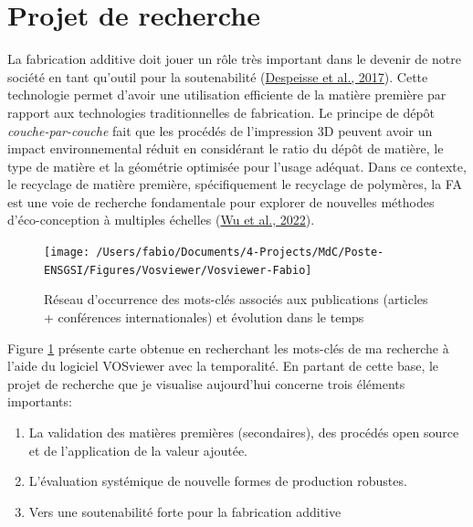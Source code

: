 \documentclass[
  12pt,
  oneside]{book}
\providecommand{\tightlist}{%
  \setlength{\itemsep}{0pt}\setlength{\parskip}{0pt}}
\begin{document}
\hypertarget{projet-de-recherche}{%
\section{Projet de recherche}\label{projet-de-recherche}}

La fabrication additive doit jouer un rôle très important dans le devenir de notre société en tant qu'outil pour la soutenabilité (\protect\hyperlink{ref-Despeisse2016}{Despeisse et al., 2017}). Cette technologie permet d'avoir une utilisation efficiente de la matière première par rapport aux technologies traditionnelles de fabrication. Le principe de dépôt \emph{couche-par-couche} fait que les procédés de l'impression 3D peuvent avoir un impact environnemental réduit en considérant le ratio du dépôt de matière, le type de matière et la géométrie optimisée pour l'usage adéquat. Dans ce contexte, le recyclage de matière première, spécifiquement le recyclage de polymères, la FA est une voie de recherche fondamentale pour explorer de nouvelles méthodes d'éco-conception à multiples échelles (\protect\hyperlink{ref-Wu2021a}{Wu et al., 2022}).

\begin{figure}

{\centering \texttt{[image: /Users/fabio/Documents/4-Projects/MdC/Poste-ENSGSI/Figures/Vosviewer/Vosviewer-Fabio]} 

}

\caption{Réseau d’occurrence des mots-clés associés aux publications (articles + conférences internationales) et évolution dans le temps}\label{fig:vosviewer}
\end{figure}

Figure \ref{fig:vosviewer} présente carte obtenue en recherchant les mots-clés de ma recherche à l'aide du logiciel VOSviewer avec la temporalité. En partant de cette base, le projet de recherche que je visualise aujourd'hui concerne trois éléments importants:

\begin{enumerate}
\def\labelenumi{\arabic{enumi}.}
\tightlist
\item
  La validation des matières premières (secondaires), des procédés open source et de l'application de la valeur ajoutée.
\item
  L'évaluation systémique de nouvelle formes de production robustes.
\item
  Vers une soutenabilité forte pour la fabrication additive
\end{enumerate}
\end{document}
